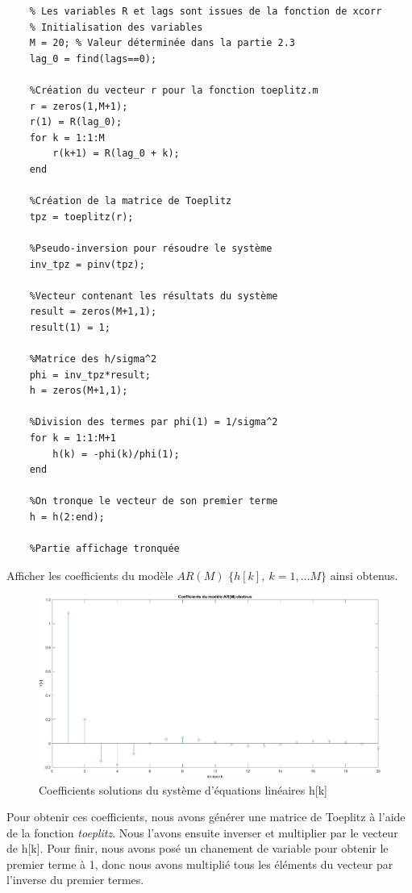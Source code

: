 \documentclass{article}
\begin{document}
\begin{verbatim}
    % Les variables R et lags sont issues de la fonction de xcorr
    % Initialisation des variables
    M = 20; % Valeur déterminée dans la partie 2.3
    lag_0 = find(lags==0);
    
    %Création du vecteur r pour la fonction toeplitz.m
    r = zeros(1,M+1);
    r(1) = R(lag_0);
    for k = 1:1:M
        r(k+1) = R(lag_0 + k);
    end
    
    %Création de la matrice de Toeplitz
    tpz = toeplitz(r);
    
    %Pseudo-inversion pour résoudre le système 
    inv_tpz = pinv(tpz);
    
    %Vecteur contenant les résultats du système
    result = zeros(M+1,1);
    result(1) = 1;
    
    %Matrice des h/sigma^2
    phi = inv_tpz*result;
    h = zeros(M+1,1);
    
    %Division des termes par phi(1) = 1/sigma^2
    for k = 1:1:M+1
        h(k) = -phi(k)/phi(1);
    end
    
    %On tronque le vecteur de son premier terme
    h = h(2:end);    
    
    %Partie affichage tronquée
\end{verbatim}

\clearpage
Afficher les coefficients  du modèle $AR(M)$ $\{h[k],~k=1,\ldots M\}$ ainsi obtenus.

\begin{figure}[!h]
    \centering
    \includegraphics[width=1\textwidth]{images/hk_solution.png}
    \caption{Coefficients solutions du système d'équations linéaires h[k]}
    \label{fig-binaire}
\end{figure}
Pour obtenir ces coefficients, nous avons générer une matrice de Toeplitz à l'aide de la fonction \textit{toeplitz}. Nous l'avons ensuite inverser et multiplier par le vecteur de h[k]. Pour finir, nous avons posé un chanement de variable pour obtenir le premier terme à 1, donc nous avons multiplié tous les éléments du vecteur par l'inverse du premier termes.
\clearpage
\end{document}
